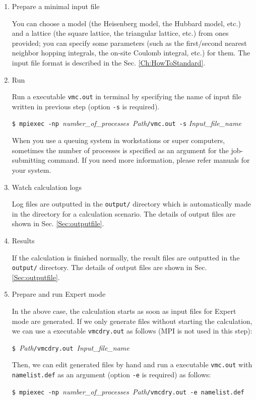 \begin{enumerate}

\item  Prepare a minimal input file

You can choose a model (the Heisenberg model, the Hubbard model, etc.) and 
a lattice (the square lattice, the triangular lattice, etc.) from ones provided;
you can specify some parameters (such as the first/second nearest neighbor hopping integrals,
the on-site Coulomb integral, etc.) for them.
The input file format is described in the Sec. \ref{Ch:HowToStandard}.

\item  Run

Run a executable \verb|vmc.out| in terminal by specifying
the name of input file written in previous step
(option \verb|-s| is required).

\verb|$ mpiexec -np |\textit{number\_of\_processes}\verb| |\textit{Path}\verb|/vmc.out -s| \textit{Input\_file\_name}

When you use a queuing system in workstations or super computers, 
sometimes the number of processes is specified as an argument for the job-submitting command.
If you need more information, please refer manuals for your system. 

\item Watch calculation logs

Log files are outputted in the \verb|output/| directory which is automatically made in the directory for a calculation scenario.
The details of output files are shown in Sec. \ref{Sec:outputfile}.

\item Results

  If the calculation is finished normally, the result files are outputted in the \verb|output/| directory.
  The details of output files are shown in Sec. \ref{Sec:outputfile}.

\item Prepare and run Expert mode

  In the above case, the calculation starts as soon as input files
  for Expert mode are generated.
  If we only generate files without starting the calculation,
  we can use a executable \verb|vmcdry.out| as follows
  (MPI is not used in this step):

  \verb|$ |\textit{Path}\verb|/vmcdry.out |\textit{Input\_file\_name}

  Then, we can edit generated files by hand and run a executable \verb|vmc.out| with 
  \verb|namelist.def| as an argument (option \verb|-e| is required) as follows:

  \verb|$ mpiexec -np |\textit{number\_of\_processes}\verb| |\textit{Path}\verb|/vmcdry.out -e namelist.def|

\end{enumerate}

